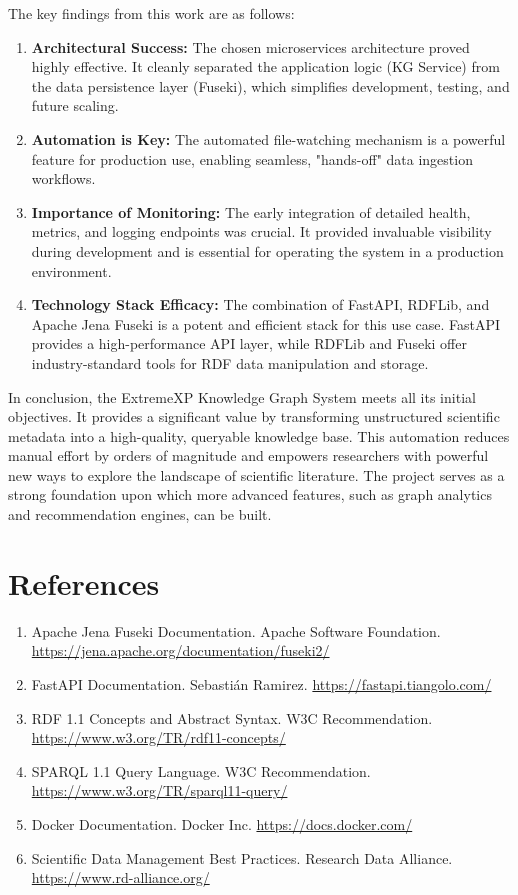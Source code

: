 \documentclass[12pt,a4paper]{article}
\begin{document}
The key findings from this work are as follows:
\begin{enumerate}
    \item \textbf{Architectural Success:} The chosen microservices architecture proved highly effective. It cleanly separated the application logic (KG Service) from the data persistence layer (Fuseki), which simplifies development, testing, and future scaling.
    \item \textbf{Automation is Key:} The automated file-watching mechanism is a powerful feature for production use, enabling seamless, "hands-off" data ingestion workflows.
    \item \textbf{Importance of Monitoring:} The early integration of detailed health, metrics, and logging endpoints was crucial. It provided invaluable visibility during development and is essential for operating the system in a production environment.
    \item \textbf{Technology Stack Efficacy:} The combination of FastAPI, RDFLib, and Apache Jena Fuseki is a potent and efficient stack for this use case. FastAPI provides a high-performance API layer, while RDFLib and Fuseki offer industry-standard tools for RDF data manipulation and storage.
\end{enumerate}

In conclusion, the ExtremeXP Knowledge Graph System meets all its initial objectives. It provides a significant value by transforming unstructured scientific metadata into a high-quality, queryable knowledge base. This automation reduces manual effort by orders of magnitude and empowers researchers with powerful new ways to explore the landscape of scientific literature. The project serves as a strong foundation upon which more advanced features, such as graph analytics and recommendation engines, can be built.


\appendix

\section{References}
\begin{enumerate}
    \item Apache Jena Fuseki Documentation. Apache Software Foundation. \url{https://jena.apache.org/documentation/fuseki2/}
    \item FastAPI Documentation. Sebastián Ramirez. \url{https://fastapi.tiangolo.com/}
    \item RDF 1.1 Concepts and Abstract Syntax. W3C Recommendation. \url{https://www.w3.org/TR/rdf11-concepts/}
    \item SPARQL 1.1 Query Language. W3C Recommendation. \url{https://www.w3.org/TR/sparql11-query/}
    \item Docker Documentation. Docker Inc. \url{https://docs.docker.com/}
    \item Scientific Data Management Best Practices. Research Data Alliance. \url{https://www.rd-alliance.org/}
\end{enumerate}
\end{document}
